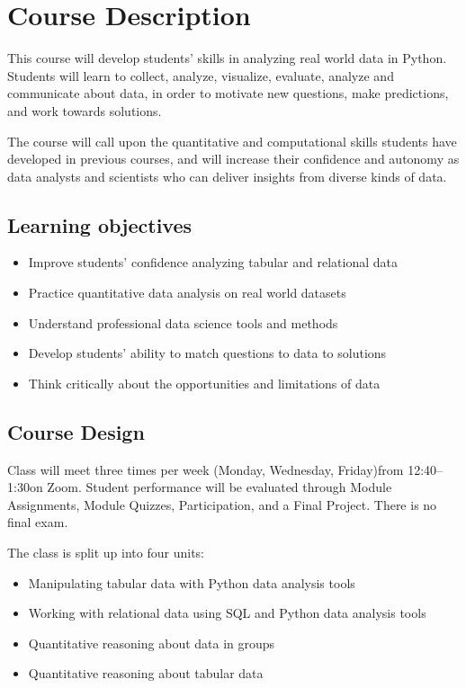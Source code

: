 \documentclass[10pt]{memoir}
\def\mymeetingdays{Monday, Wednesday, Friday}
\def\mymeetingtimes{12:40--1:30}
\begin{document}
\section{\textbf{Course Description}}

This course will develop students' skills in analyzing real world data in Python. Students will learn to collect, analyze, visualize, evaluate, analyze and communicate about data, in order to motivate new questions, make predictions, and work towards solutions. 

The course will call upon the quantitative and computational skills students have developed in previous courses, and will increase their confidence and autonomy as data analysts and scientists who can deliver insights from diverse kinds of data.

\subsection{Learning objectives}

\begin{itemize}
    \item Improve students' confidence analyzing tabular and relational data
    \item Practice quantitative data analysis on real world datasets
    \item Understand professional data science tools and methods
    \item Develop students' ability to match questions to data to solutions
    \item Think critically about the opportunities and limitations of data
\end{itemize}

\subsection{Course Design}
Class will meet three times per week (\mymeetingdays)\space from \mymeetingtimes\space on Zoom. Student performance will be evaluated through Module Assignments, Module Quizzes, Participation, and a Final Project. There is no final exam.

The class is split up into four units: 

\begin{itemize}
\item Manipulating tabular data with Python data analysis tools
\item Working with relational data using SQL and Python data analysis tools
\item Quantitative reasoning about data in groups
\item Quantitative reasoning about tabular data
\end{itemize}
\end{document}
